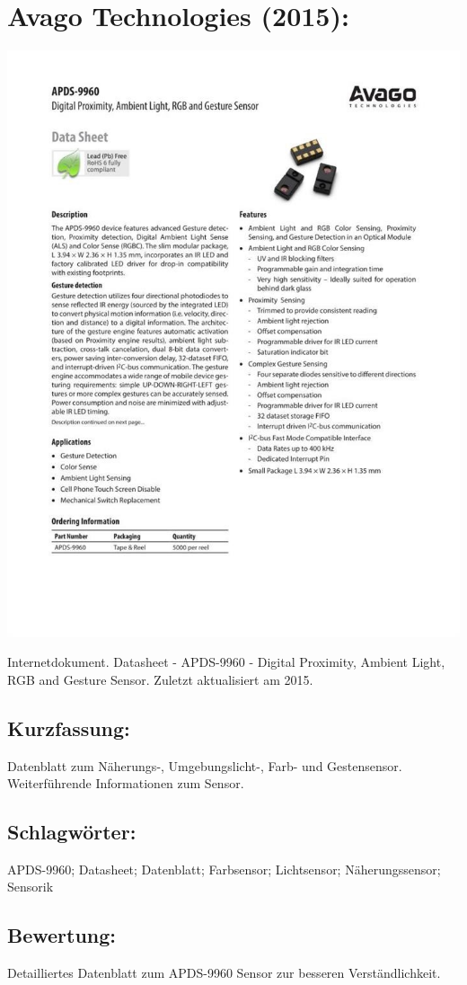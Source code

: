 \section*{Avago Technologies (2015):}
\begin{minipage}{0.5\textwidth}
	\includegraphics[width=\linewidth]{../Appendix/Literaturverzeichnis/img/Avago.jpg}
\end{minipage}
\hfill
\begin{minipage}{0.48\textwidth}
Internetdokument. Datasheet - APDS-9960 - Digital Proximity, Ambient Light, RGB and Gesture Sensor. Zuletzt aktualisiert am 2015.
\subsection*{Kurzfassung:}
Datenblatt zum Näherungs-, Umgebungslicht-, Farb- und Gestensensor.
Weiterführende Informationen zum Sensor.
\subsection*{Schlagwörter:}
APDS-9960; Datasheet; Datenblatt; Farbsensor; Lichtsensor; Näherungssensor; Sensorik
\subsection*{Bewertung:}
Detailliertes Datenblatt zum APDS-9960 Sensor zur besseren Verständlichkeit.
\end{minipage}

